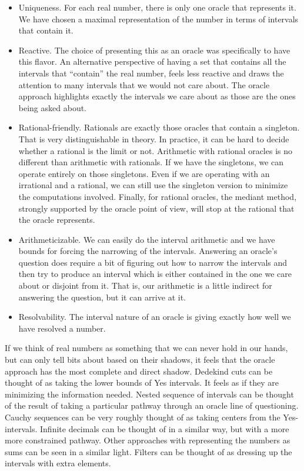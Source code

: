 \documentclass[12pt]{article}
\theoremstyle{remark}
\begin{document}
\begin{itemize}
    \item Uniqueness. For each real number, there is only one oracle that represents it. We have chosen a maximal representation of the number in terms of intervals that contain it. 
    \item Reactive. The choice of presenting this as an oracle was specifically to have this flavor. An alternative perspective of having a set that contains all the intervals that ``contain'' the real number, feels less reactive and draws the attention to many intervals that we would not care about. The oracle approach highlights exactly the intervals we care about as those are the ones being asked about.
    \item Rational-friendly. Rationals are exactly those oracles that contain a singleton. That is very distinguishable in theory. In practice, it can be hard to decide whether a rational is the limit or not. Arithmetic with rational oracles is no different than arithmetic with rationals. If we have the singletons, we can operate entirely on those singletons. Even if we are operating with an irrational and a rational, we can still use the singleton version to minimize the computations involved. Finally, for rational oracles, the mediant method, strongly supported by the oracle point of view, will stop at the rational that the oracle represents.
    \item Arithmeticizable. We can easily do the interval arithmetic and we have bounds for forcing the narrowing of the intervals. Answering an oracle's question does require a bit of figuring out how to narrow the intervals and then try to produce an interval which is either contained in the one we care about or disjoint from it. That is, our arithmetic is a little indirect for answering the question, but it can arrive at it.
    \item Resolvability. The interval nature of an oracle is giving exactly how well we have resolved a number. 
\end{itemize}

If we think of real numbers as something that we can never hold in our hands, but can only tell bits about based on their shadows, it feels that the oracle approach has the most complete and direct shadow. Dedekind cuts can be thought of as taking the lower bounds of Yes intervals. It feels as if they are minimizing the information needed.  Nested sequence of intervals can be thought of the result of taking a particular pathway through an oracle line of questioning. Cauchy sequences can be very roughly thought of as taking centers from the Yes-intervals. Infinite decimals can be thought of in a similar way, but with a more more constrained pathway.  Other approaches with representing the numbers as sums can be seen in a  similar light. Filters can be thought of as dressing up the intervals with extra elements.
\end{document}

